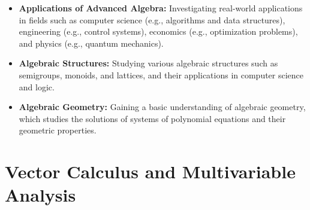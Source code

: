 \documentclass[openany]{book}
\begin{document}
\begin{itemize}
    \item \textbf{Applications of Advanced Algebra:} Investigating real-world applications in fields such as computer science (e.g., algorithms and data structures), engineering (e.g., control systems), economics (e.g., optimization problems), and physics (e.g., quantum mechanics).
    \item \textbf{Algebraic Structures:} Studying various algebraic structures such as semigroups, monoids, and lattices, and their applications in computer science and logic.
    \item \textbf{Algebraic Geometry:} Gaining a basic understanding of algebraic geometry, which studies the solutions of systems of polynomial equations and their geometric properties.
\end{itemize}
\section{Vector Calculus and Multivariable Analysis}
\end{document}
